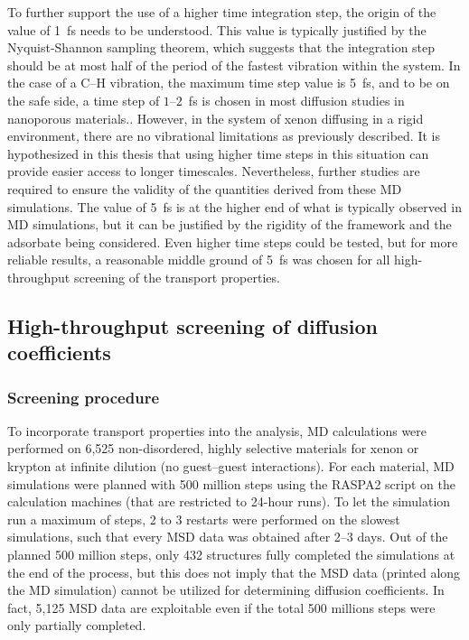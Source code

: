 \documentclass[main]{subfiles}
\begin{document}
To further support the use of a higher time integration step, the origin of the value of \SI{1}{\fs} needs to be understood. This value is typically justified by the Nyquist-Shannon sampling theorem, which suggests that the integration step should be at most half of the period of the fastest vibration within the system. In the case of a C--H vibration, the maximum time step value is \SI{5}{\fs}, and to be on the safe side, a time step of $1$--$2$~\si{\fs} is chosen in most diffusion studies in nanoporous materials.\autocite{Bukowski_2021}. However, in the system of xenon diffusing in a rigid environment, there are no vibrational limitations as previously described. It is hypothesized in this thesis that using higher time steps in this situation can provide easier access to longer timescales. Nevertheless, further studies are required to ensure the validity of the quantities derived from these MD simulations. The value of \SI{5}{\fs} is at the higher end of what is typically observed in MD simulations, but it can be justified by the rigidity of the framework and the adsorbate being considered. Even higher time steps could be tested, but for more reliable results, a reasonable middle ground of \SI{5}{\fs} was chosen for all high-throughput screening of the transport properties.

\subsection{High-throughput screening of diffusion coefficients}

\subsubsection{Screening procedure}

To incorporate transport properties into the analysis, MD calculations were performed on 6,525 non-disordered, highly selective materials for xenon or krypton at infinite dilution (no guest--guest interactions). For each material, MD simulations were planned with 500 million steps using the RASPA2 script on the calculation machines (that are restricted to 24-hour runs). To let the simulation run a maximum of steps, 2 to 3 restarts were performed on the slowest simulations, such that every MSD data was obtained after 2--3 days. Out of the planned 500 million steps, only 432 structures  fully completed the simulations at the end of the process, but this does not imply that the MSD data (printed along the MD simulation) cannot be utilized for determining diffusion coefficients. In fact, 5,125 MSD data are exploitable even if the total 500 millions steps were only partially completed. 
\end{document}
